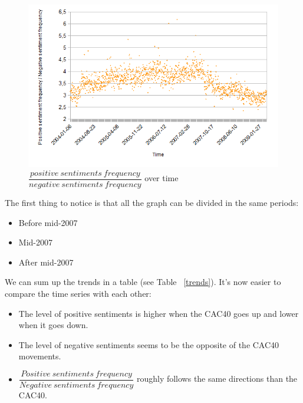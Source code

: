 \documentclass[12pt]{report}
\begin{document}
			\begin{figure}[h]
				\caption{$\dfrac{positive\ sentiments\ frequency}{negative\ sentiments\ frequency}$ over time\label{posdivneg}}
				\includegraphics{plots/time/posdivneg.png}
			\end{figure}
			
			The first thing to notice is that all the graph can be divided in the same periods:
			\begin{itemize}
				\item Before mid-2007
				\item Mid-2007
				\item After mid-2007
			\end{itemize}

			 We can sum up the trends in a table (see Table ~\ref{trends}). It's now easier to compare the time series with each other:
			 \begin{itemize}
			 	\item The level of positive sentiments is higher when the CAC40 goes up and lower when it goes down.
			 	\item The level of negative sentiments seems to be the opposite of the CAC40 movements.
			 	\item $\dfrac{Positive\ sentiments\ frequency}{Negative\ sentiments\ frequency}$ roughly follows the same directions than the CAC40.
			 \end{itemize}
\end{document}
